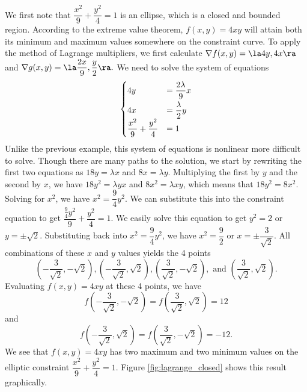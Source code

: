 
\newpage

{We first note that $\dfrac{x^2}{9} + \dfrac{y^2}{4} = 1$ is an ellipse, which is a closed and bounded region. According to the extreme value theorem, $f(x,y) = 4xy$ will attain both its minimum and maximum values somewhere on the constraint curve. To apply the method of Lagrange multipliers, we first calculate $\nabla f(x,y) = \la 4y, 4x \ra$ and $\nabla g(x,y) = \la \dfrac{2x}{9}, \dfrac{y}{2} \ra.$ We need to solve the system of equations
	\[
	\begin{cases}
		4y                              & = \dfrac{2\lambda}{9}x \smallskip \\
		4x                              & = \dfrac{\lambda}{2}y  \\
		\dfrac{x^2}{9} + \dfrac{y^2}{4} & = 1
	\end{cases}
	\]
Unlike the previous example, this system of equations is nonlinear more difficult to solve.  Though there are many paths to the solution, we start by rewriting the first two equations as $18y = \lambda x$ and $8x = \lambda y.$  Multiplying the first by $y$ and the second by $x$, we have $18y^2 = \lambda yx$ and $8x^2 = \lambda xy$, which means that $18y^2 = 8x^2$.  Solving for $x^2$, we have $x^2 = \dfrac{9}{4}y^2$.  We can substitute this into the constraint equation to get $\dfrac{\frac{9}{4}y^2}{9} + \dfrac{y^2}{4} = 1.$ We easily solve this equation to get $y^2 = 2$ or $y = \pm \sqrt{2}$. Substituting back into $x^2 = \dfrac{9}{4}y^2$, we have $x^2 = \dfrac{9}{2}$ or $x = \pm \dfrac{3}{\sqrt{2}}.$ All combinations of these $x$ and $y$ values yields the 4 points
	\[
		\left ( -\frac{3}{\sqrt{2}},-\sqrt{2}\right), 	\left ( -\frac{3}{\sqrt{2}},\sqrt{2}\right), 	\left ( \frac{3}{\sqrt{2}},-\sqrt{2}\right), \text{ and } 	\left ( \frac{3}{\sqrt{2}},\sqrt{2}\right).
	\]
Evaluating $f(x,y) = 4xy$ at these 4 points, we have
	\[
	f\left ( -\frac{3}{\sqrt{2}},-\sqrt{2}\right) = f\left ( \frac{3}{\sqrt{2}},\sqrt{2}\right) = 12
	\]
and
	\[
		f\left ( -\frac{3}{\sqrt{2}},\sqrt{2}\right) = f\left ( \frac{3}{\sqrt{2}},-\sqrt{2}\right) = -12.
	\]
We see that $f(x,y) = 4xy$ has two maximum and two minimum values on the elliptic constraint $\dfrac{x^2}{9} + \dfrac{y^2}{4} = 1$. Figure \ref{fig:lagrange_closed} shows this result graphically.
}

